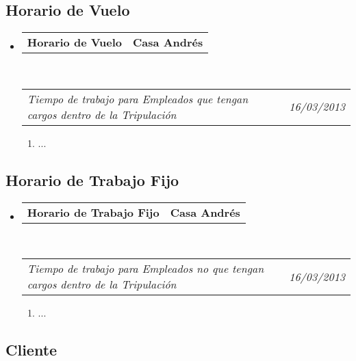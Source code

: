 \documentclass[10pt,letterpaper]{article}
\makeatletter
\newcommand{\headerrow}[2]
{\begin{tabular*}{\linewidth}{l@{\extracolsep{\fill}}r}
	#1 &
	#2 \\
\end{tabular*}}
\makeatother
\begin{document}
\subsection*{Horario de Vuelo}

\begin{itemize}
	\parskip=0.1em

	\item
	\headerrow
		{\textbf{Horario de Vuelo}}
		{\textbf{Casa Andrés}}
	\\
	\headerrow
		{\emph{Tiempo de trabajo para Empleados que tengan cargos dentro de la Tripulación}}
		{\emph{16/03/2013}}
	\begin{enumerate}
		\item ...
	\end{enumerate}

\end{itemize}

\subsection*{Horario de Trabajo Fijo}

\begin{itemize}
	\parskip=0.1em

	\item
	\headerrow
		{\textbf{Horario de Trabajo Fijo}}
		{\textbf{Casa Andrés}}
	\\
	\headerrow
		{\emph{Tiempo de trabajo para Empleados no que tengan cargos dentro de la Tripulación}}
		{\emph{16/03/2013}}
	\begin{enumerate}
		\item ...
	\end{enumerate}

\end{itemize}

\subsection*{Cliente}
\end{document}
